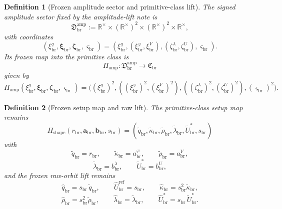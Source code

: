 \documentclass[11pt]{article}
\newcommand{\RespShapeReadout}{\widetilde q_{\mathrm{br}}}
\newcommand{\RespShapeCov}{\widetilde\kappa_{\mathrm{br}}}
\newcommand{\RespShapeRelax}{\widetilde\rho_{\mathrm{br}}}
\newcommand{\RespShapeWell}{\widetilde\lambda_{\mathrm{br}}}
\newcommand{\RespShapeEq}{\widetilde U_{\mathrm{br}}^{\ast}}
\newcommand{\RespRawReadout}{\widehat q_{\mathrm{br}}}
\newcommand{\RespRawRef}{\widehat U_{\mathrm{br}}^{\mathrm{ref}}}
\newcommand{\RespRawCov}{\widehat\kappa_{\mathrm{br}}}
\newcommand{\RespRawRelax}{\widehat\rho_{\mathrm{br}}}
\newcommand{\RespRawWell}{\widehat\lambda_{\mathrm{br}}}
\newcommand{\RespRawEq}{\widehat U_{\mathrm{br}}^{\ast}}
\newcommand{\ScaleMod}{s_{\mathrm{br}}}
\newcommand{\PrimClass}{\mathfrak C_{\mathrm{br}}}
\newcommand{\PrimRead}{r_{\mathrm{br}}}
\newcommand{\PrimCovSlot}{a_{\mathrm{br}}^{\varphi}}
\newcommand{\PrimRelaxSlot}{a_{\mathrm{br}}^{V}}
\newcommand{\PrimKinetic}{\bm a_{\mathrm{br}}}
\newcommand{\PrimWellSlot}{b_{\mathrm{br}}^{\lambda}}
\newcommand{\PrimEqSlot}{b_{\mathrm{br}}^{U}}
\newcommand{\PrimAnchor}{\bm b_{\mathrm{br}}}
\newcommand{\PrimMap}{\Pi_{\mathrm{shape}}}
\newcommand{\LiftSector}{\mathfrak D_{\mathrm{br}}^{\mathrm{amp}}}
\newcommand{\DeepReadAmp}{\xi_{\mathrm{br}}^{q}}
\newcommand{\DeepCovAmp}{\xi_{\mathrm{br}}^{\varphi}}
\newcommand{\DeepRelaxAmp}{\xi_{\mathrm{br}}^{V}}
\newcommand{\DeepKinAmp}{\bm\xi_{\mathrm{br}}}
\newcommand{\DeepWellAmp}{\zeta_{\mathrm{br}}^{\lambda}}
\newcommand{\DeepEqAmp}{\zeta_{\mathrm{br}}^{U}}
\newcommand{\DeepAnchorAmp}{\bm\zeta_{\mathrm{br}}}
\newcommand{\DeepScaleAmp}{\varsigma_{\mathrm{br}}}
\newcommand{\AmpMap}{\Pi_{\mathrm{amp}}}
\newcommand{\Rstar}{\mathbb R^{\times}}
\newtheorem{definition}{Definition}
\begin{document}
\begin{definition}[Frozen amplitude sector and primitive-class lift]
\label{def:frozenamp}
The signed amplitude sector fixed by the amplitude-lift note is
\begin{equation}
\LiftSector
:=
\Rstar\times(\Rstar)^2\times(\Rstar)^2\times\Rstar,
\label{eq:liftsector}
\end{equation}
with coordinates
\begin{equation}
(\DeepReadAmp,\DeepKinAmp,\DeepAnchorAmp,\DeepScaleAmp)
=
(\DeepReadAmp,(\DeepCovAmp,\DeepRelaxAmp),(\DeepWellAmp,\DeepEqAmp),\DeepScaleAmp).
\label{eq:liftcoords}
\end{equation}
Its frozen map into the primitive class is
\begin{equation}
\AmpMap:\LiftSector\longrightarrow\PrimClass
\label{eq:ampmap}
\end{equation}
given by
\begin{equation}
\AmpMap(\DeepReadAmp,\DeepKinAmp,\DeepAnchorAmp,\DeepScaleAmp)
=
\bigl(
(\DeepReadAmp)^2,
((\DeepCovAmp)^2,(\DeepRelaxAmp)^2),
((\DeepWellAmp)^2,(\DeepEqAmp)^2),
(\DeepScaleAmp)^2
\bigr).
\label{eq:ampmapexplicit}
\end{equation}
\end{definition}

\begin{definition}[Frozen setup map and raw lift]
\label{def:frozenraw}
The primitive-class setup map remains
\begin{equation}
\PrimMap(\PrimRead,\PrimKinetic,\PrimAnchor,\ScaleMod)
=
(\RespShapeReadout,\RespShapeCov,\RespShapeRelax,\RespShapeWell,\RespShapeEq,\ScaleMod)
\label{eq:primmap}
\end{equation}
with
\begin{equation}
\RespShapeReadout=\PrimRead,
\qquad
\RespShapeCov=\PrimCovSlot,
\qquad
\RespShapeRelax=\PrimRelaxSlot,
\label{eq:shapeA}
\end{equation}
\begin{equation}
\RespShapeWell=\PrimWellSlot,
\qquad
\RespShapeEq=\PrimEqSlot,
\label{eq:shapeB}
\end{equation}
and the frozen raw-orbit lift remains
\begin{equation}
\RespRawReadout=\ScaleMod\,\RespShapeReadout,
\qquad
\RespRawRef=\ScaleMod,
\qquad
\RespRawCov=\ScaleMod^{2}\RespShapeCov,
\label{eq:rawliftA}
\end{equation}
\begin{equation}
\RespRawRelax=\ScaleMod^{2}\RespShapeRelax,
\qquad
\RespRawWell=\RespShapeWell,
\qquad
\RespRawEq=\ScaleMod\,\RespShapeEq.
\label{eq:rawliftB}
\end{equation}
\end{definition}
\end{document}

